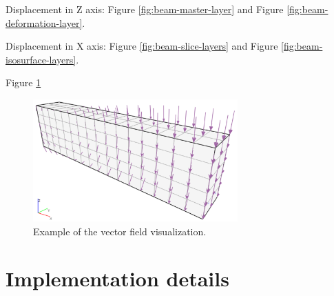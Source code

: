
Displacement in Z axis: Figure \ref{fig:beam-master-layer} and Figure \ref{fig:beam-deformation-layer}.

Displacement in X axis: Figure \ref{fig:beam-slice-layers} and Figure \ref{fig:beam-isosurface-layers}.


Figure \ref{fig:beam-vectors}

\begin{figure}[H]
    \centering
    \includegraphics[width=0.7\textwidth]{figures/chapter-data-management/beam-vectors}
    \decoRule
    \caption{Example of the vector field visualization.}
    \label{fig:beam-vectors}
\end{figure}


\section{Implementation details}
\label{sec:implementation-details}



